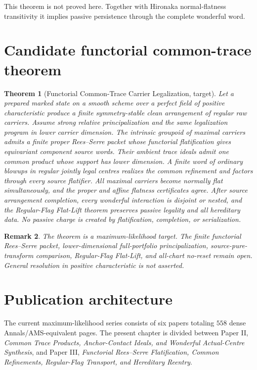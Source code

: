 \documentclass[11pt]{amsart}
\newtheorem{theorem}{Theorem}[section]
\newtheorem{remark}[theorem]{Remark}
\begin{document}
This theorem is not proved here.  Together with Hironaka normal-flatness
transitivity it implies passive persistence through the complete wonderful
word.

\section{Candidate functorial common-trace theorem}
\begin{theorem}[Functorial Common-Trace Carrier Legalization, target]
Let a prepared marked state on a smooth scheme over a perfect field of positive
characteristic produce a finite symmetry-stable clean arrangement of regular
raw carriers.  Assume strong relative principalization and the same
legalization program in lower carrier dimension.  The intrinsic groupoid of
maximal carriers admits a finite proper Rees--Serre packet whose functorial
flatification gives equivariant component source words.  Their ambient trace
ideals admit one common product whose support has lower dimension.  A finite
word of ordinary blowups in regular jointly legal centres realizes the common
refinement and factors through every source flatifier.  All maximal carriers
become normally flat simultaneously, and the proper and affine flatness
certificates agree.  After source arrangement completion, every wonderful
interaction is disjoint or nested, and the Regular-Flag Flat-Lift theorem
preserves passive legality and all hereditary data.  No passive charge is
created by flatification, completion, or serialization.
\end{theorem}

\begin{remark}
The theorem is a maximum-likelihood target.  The finite functorial Rees--Serre
packet, lower-dimensional full-portfolio principalization,
source-pure-transform comparison, Regular-Flag Flat-Lift, and all-chart no-reset
remain open.  General resolution in positive characteristic is not asserted.
\end{remark}

\section{Publication architecture}
The current maximum-likelihood series consists of six papers totaling $558$
dense Annals/AMS-equivalent pages.  The present chapter is divided between
Paper II, \emph{Common Trace Products, Anchor-Contact Ideals, and Wonderful
Actual-Centre Synthesis}, and Paper III, \emph{Functorial Rees--Serre
Flatification, Common Refinements, Regular-Flag Transport, and Hereditary
Reentry}.
\end{document}

